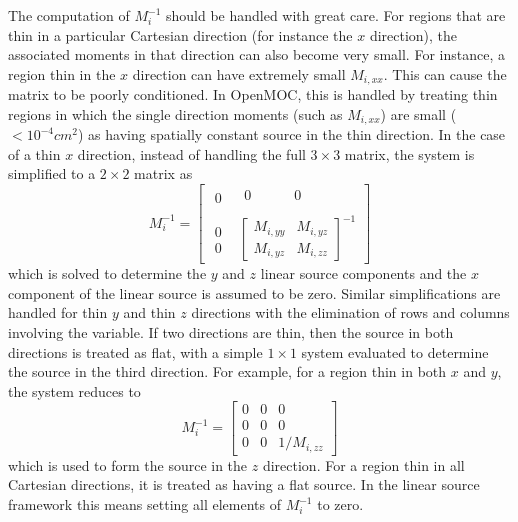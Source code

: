 The computation of $M_i^{-1}$ should be handled with great care. For regions that are thin in a particular Cartesian direction (for instance the $x$ direction), the associated moments in that direction can also become very small. For instance, a region thin in the $x$ direction can have extremely small $M_{i,xx}$. This can cause the matrix to be poorly conditioned. In OpenMOC, this is handled by treating thin regions in which the single direction moments (such as $M_{i,xx}$) are small ($ < 10^{-4} \textit{cm}^2$) as having spatially constant source in the thin direction. In the case of a thin $x$ direction, instead of handling the full $3 \times 3$ matrix, the system is simplified to a $2 \times 2$ matrix as
\begin{equation*}
M_i^{-1} = 
\begin{bmatrix}
\begin{matrix}
0  
\end{matrix}
& \begin{matrix} 
0\phantom{M_{i,yy}}  & 0\phantom{M_{i,yz}}
\end{matrix} \\
\begin{matrix} 
0 \\ 0 
\end{matrix}
& \begin{bmatrix}
M_{i,yy}  & M_{i,yz} \\
M_{i,yz}  & M_{i,zz}
\end{bmatrix}^{-1}
\end{bmatrix}
\end{equation*}
which is solved to determine the $y$ and $z$ linear source components and the $x$ component of the linear source is assumed to be zero. Similar simplifications are handled for thin $y$ and thin $z$ directions with the elimination of rows and columns involving the variable. If two directions are thin, then the source in both directions is treated as flat, with a simple $1\times1$ system evaluated to determine the source in the third direction. For example, for a region thin in both $x$ and $y$, the system reduces to
\begin{equation*}
M_i^{-1} = 
\begin{bmatrix}
0 & 0  & 0 \\
0 & 0  & 0 \\
0 & 0  & 1 / M_{i,zz}
\end{bmatrix}
\end{equation*}
which is used to form the source in the $z$ direction. For a region thin in all Cartesian directions, it is treated as having a flat source. In the linear source framework this means setting all elements of $M_i^{-1}$ to zero.

